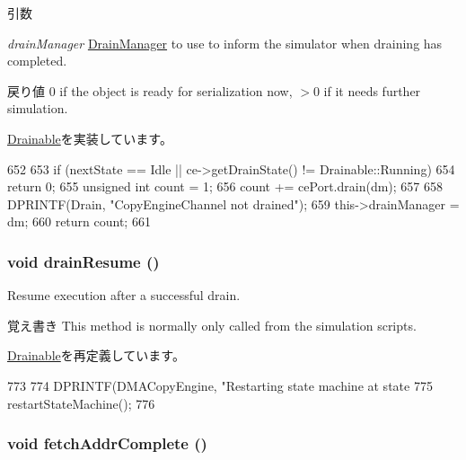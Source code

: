 \begin{DoxyParams}{引数}
\item[{\em drainManager}]\hyperlink{classDrainManager}{DrainManager} to use to inform the simulator when draining has completed.\end{DoxyParams}
\begin{DoxyReturn}{戻り値}
0 if the object is ready for serialization now, $>$0 if it needs further simulation. 
\end{DoxyReturn}


\hyperlink{classDrainable_a1ed42c14f2f622ea6b0df3865e89c8b4}{Drainable}を実装しています。


\begin{DoxyCode}
652 {
653     if (nextState == Idle || ce->getDrainState() != Drainable::Running)
654         return 0;
655     unsigned int count = 1;
656     count += cePort.drain(dm);
657 
658     DPRINTF(Drain, "CopyEngineChannel not drained\n");
659     this->drainManager = dm;
660     return count;
661 }
\end{DoxyCode}
\hypertarget{classCopyEngine_1_1CopyEngineChannel_a8f020d3237536fe007fc488c4125c5d8}{
\subsubsection[{drainResume}]{\setlength{\rightskip}{0pt plus 5cm}void drainResume ()}}
\label{classCopyEngine_1_1CopyEngineChannel_a8f020d3237536fe007fc488c4125c5d8}
Resume execution after a successful drain.

\begin{DoxyNote}{覚え書き}
This method is normally only called from the simulation scripts. 
\end{DoxyNote}


\hyperlink{classDrainable_a8f020d3237536fe007fc488c4125c5d8}{Drainable}を再定義しています。


\begin{DoxyCode}
773 {
774     DPRINTF(DMACopyEngine, "Restarting state machine at state %
775     restartStateMachine();
776 }
\end{DoxyCode}
\hypertarget{classCopyEngine_1_1CopyEngineChannel_a35f044598c449411508cd2592e06ff8e}{
\subsubsection[{fetchAddrComplete}]{\setlength{\rightskip}{0pt plus 5cm}void fetchAddrComplete ()}}
\label{classCopyEngine_1_1CopyEngineChannel_a35f044598c449411508cd2592e06ff8e}



